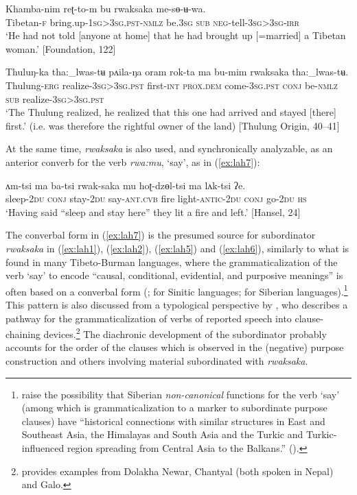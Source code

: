\documentclass[output=paper,colorlinks,citecolor=brown,
]{langscibook}
\begin{document}
\ea
\label{ex:lah5}
\gll Khamba-nim reʈ-to-m bu rwaksaka me-sɵ-ʉ-wa. \\
Tibetan-\textsc{f} bring.up-\textsc{1sg>3sg.pst-nmlz} be.\textsc{3sg} \textsc{sub} \textsc{neg-}tell-\textsc{3sg>3sg-irr} \\
\glt `He had not told [anyone at home] that he had brought up [=married] a Tibetan woman.' [Foundation, 122]
\z

 
\ea \label{ex:lah6}
\gll Thuluŋ-ka tha:\_lwas-tʉ pʌila-ŋa oram rok-ta ma bu-mim rwaksaka tha:\_lwas-tʉ. \\
Thulung-\textsc{erg} realize-\textsc{3sg>3sg.pst} first-\textsc{int} \textsc{prox.dem} come-\textsc{3sg.pst} \textsc{conj} be-\textsc{nmlz} \textsc{sub} realize-\textsc{3sg>3sg.pst} \\
\glt `The Thulung realized, he realized that this one had arrived and stayed [there] first.' (i.e. was therefore the rightful owner of the land) [Thulung Origin, 40--41]
\z

\largerpage
 At the same time, \textit{rwaksaka} is also used, and synchronically analyzable, as an anterior converb for the verb \textit{rwa:mu}, `say', as in (\ref{ex:lah7}):


\ea \label{ex:lah7}
\gll ʌm-tsi ma ba-tsi rwak-saka mu hoʈ-dzɵl-tsi ma lʌk-tsi ʔe. \\
sleep-\textsc{2du} \textsc{conj} stay-\textsc{2du} say-\textsc{ant.cvb} fire light-\textsc{antic-2du} \textsc{conj} go-\textsc{2du} \textsc{hs} \\
\glt `Having said ``sleep and stay here'' they lit a fire and left.' [Hansel, 24]
\z

\noindent The converbal form in (\ref{ex:lah7}) is the presumed source for subordinator \textit{rwaksaka} in (\ref{ex:lah1}), (\ref{ex:lah2}), (\ref{ex:lah5}) and (\ref{ex:lah6}), similarly to what is found in many Tibeto-Burman languages, where the grammaticalization of the verb `say' to encode ``causal, conditional, evidential, and purposive meanings'' \citep[202]{Coupe2018} is often based on a converbal form (\citealt[200--201]{Coupe2018}; \citealt{Chappell2008} for Sinitic languages; \citealt{MaticPakendorf2013} for Siberian languages).\footnote{\citeauthor{MaticPakendorf2013} raise the possibility that Siberian \textit{non-canonical} functions for the verb `say' (among which is grammaticalization to a marker to subordinate purpose clauses) have ``historical connections with similar structures in East and Southeast Asia, the Himalayas and South Asia and the Turkic and Turkic-influenced region spreading from Central Asia to the Balkans.'' (\citealt[358]{MaticPakendorf2013}).} This pattern is also discussed from a typological perspective by \citet[387--390]{Aikhenvald2009}, who describes a pathway for the grammaticalization of verbs of reported speech into clause-chaining devices.\footnote{\citeauthor{Aikhenvald2009} provides examples from Dolakha Newar, Chantyal (both spoken in Nepal) and Galo.} The diachronic development of the subordinator probably accounts for the order of the clauses which is observed in the (negative) purpose construction and others involving material subordinated with \textit{rwaksaka}.
\end{document}
